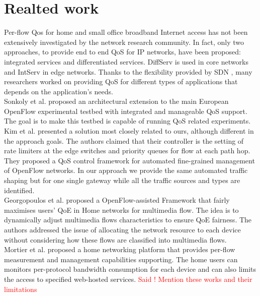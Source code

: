 \section{Realted work}
Per-flow Qos for home and small office broadband Internet access has not been extensively investigated by the network research community. In fact, only two approaches, to provide end to end QoS for IP networks, have been proposed:  integrated services and differentiated services. DiffServ is used in core networks and IntServ in edge networks. Thanks to the flexibility provided by SDN , many researchers worked on providing QoS for different types of applications that depends on the application's needs.\\
Sonkoly et al. \cite{SonkolyOfelia2012} proposed an architectural extension to  the main European OpenFlow experimental testbed with integrated and manageable QoS support. The goal is to make this testbed is capable of running QoS related experiments.
Kim et al. \cite{KimscalableQoS2010} presented a solution most closely related to ours, although different in the approach goals. The authors claimed that their controller is the setting of rate limiters at the edge switches and priority queues for flow at each path hop. They proposed a QoS control framework for automated fine-grained management of OpenFlow networks. In our approach we provide the same automated traffic shaping but for one single gateway while all the traffic sources and types are identified.\\
Georgopoulos et al. \cite{GeorgopoulosQOE2013} proposed a OpenFlow-assisted Framework that fairly maximises users' QoE in Home networks for multimedia flow. The idea is to dynamically adjust multimedia flows characteristics to ensure QoE fairness. The authors addressed the issue of allocating the network resource to each device without considering how these flows are classified into multimedia flows.\\
Mortier et al.  \cite{MortierHomeInterface2011} proposed a home networking platform that provides per-flow measurement and management capabilities supporting. The home users can monitors per-protocol bandwidth consumption for each device and can also limits the  access to specified web-hosted services.
\textcolor{red}{ Said ! Mention these works and their limitations \cite{IshimoriQoSFlow2012} 
\cite{KoOpenQFlow2013} 
}

